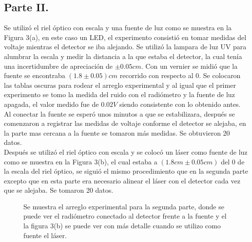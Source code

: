 \documentclass[DIV=calc, paper=a4, fontsize=11pt]{scrartcl}
\begin{document}
\subsection*{\textcolor{carmine}{Parte II.}}
Se utilizó el riel óptico con escala y una fuente de luz como se muestra en la Figura 3(a), en este caso un LED, el experimento consistió en tomar medidas del voltaje mientras el detector se iba alejando. Se utilizó la lampara de luz UV para alumbrar la escala y medir la distancia a la que estaba el detector, la cual tenía una incertidumbre de apreciación de $\pm 0.05cm$. Con un vernier se midió que la fuente se encontraba $(1.8\pm0.05)cm$ recorrido con respecto al 0. Se colocaron las tablas oscuras para rodear el arreglo experimental y al igual que el primer experimento se tomo la medida del ruido con el radiómetro y la fuente de luz apagada, el valor medido fue de $0.02V$ siendo consistente con lo obtenido antes. 
Al conectar la fuente se esperó unos minutos a que se estabilizara, después se comenzaron a registrar las medidas de voltaje conforme el detector se alejaba, en la parte mas cercana a la fuente se tomaron más medidas. Se obtuvieron 20 datos.\\
Después se utilizó el riel óptico con escala y se colocó un láser como fuente de luz como se muestra en la Figura 3(b), el cual estaba a $(1.8cm\pm0.05cm)$ del $0$ de la escala del riel óptico, se siguió el mismo procedimiento que en la segunda parte excepto que en esta parte era necesario alinear el láser con el detector cada vez que se alejaba. Se tomaron 20 datos.
\begin{figure}[H]
 \centering
 \caption{Se muestra el arreglo experimental para la segunda parte, donde se puede ver el radiómetro conectado al detector frente a la fuente y el la figura 3(b) se puede ver con más detalle cuando se utilizo como fuente el láser.}
 \label{f:Segunda Parte}
\end{figure}
\end{document}

